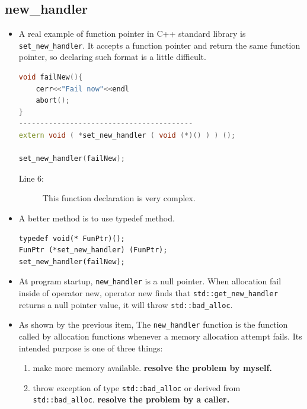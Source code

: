 \documentclass[a4paper,11pt,twoside]{book}
\begin{document}
\subsection{new\_handler}
\begin{itemize}	
	
	\item A real example of function pointer in C++ standard library is \texttt{set\_new\_handler}. It accepts a function pointer and return the same function pointer, so declaring such format is a little difficult.
\begin{lstlisting}[frame=single, language=c++]
void failNew(){
	cerr<<"Fail now"<<endl
	abort();
}
-----------------------------------------
extern void ( *set_new_handler ( void (*)() ) ) ();
			
set_new_handler(failNew);
\end{lstlisting}
		\begin{description}
			\item[Line 6:] This function declaration is very complex. 
		\end{description}
		
		\item A better method is to use typedef method.
		
\begin{lstlisting}[numbers = none]
typedef void(* FunPtr)();
FunPtr (*set_new_handler) (FunPtr);
set_new_handler(failNew);
\end{lstlisting}	
	
	\item At program startup, \texttt{new\_handler} is a null pointer. When allocation fail inside of operator new, operator new finds that \texttt{std::get\_new\_handler} returns a null pointer value, it will throw \texttt{std::bad\_alloc}.
	
	\item  As shown by the previous item, The \texttt{new\_handler} function is the function called by allocation functions whenever a memory allocation attempt fails. Its intended purpose is one of three things:
	
	\begin{enumerate}
		\item make more memory available. \textbf{resolve the problem by myself.}
		
		\item throw exception of type \texttt{std::bad\_alloc} or derived from \texttt{std::bad\_alloc}. \textbf{resolve the problem by a caller.}
		

\end{enumerate}
\end{itemize}
\end{document}
